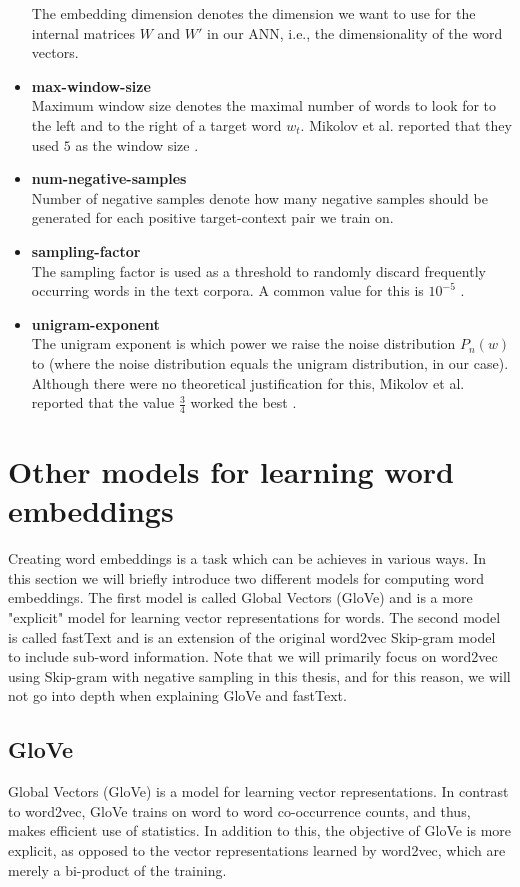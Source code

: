 \begin{itemize}
        The embedding dimension denotes the dimension we want to use for the internal matrices $W$ and $W'$ in our ANN, i.e., the dimensionality of the word vectors.
    \item \textbf{max-window-size} \\
        Maximum window size denotes the maximal number of words to look for to the left and to the right of a target word $w_t$. Mikolov et al. reported that they used $5$ as the window size \cite{mikolov2013b}.
    \item \textbf{num-negative-samples} \\
        Number of negative samples denote how many negative samples should be generated for each positive target-context pair we train on.
    \item \textbf{sampling-factor} \\
        The sampling factor is used as a threshold to randomly discard frequently occurring words in the text corpora. A common value for this is $10^{-5}$ \cite{mikolov2013b}.
    \item \textbf{unigram-exponent} \\
        The unigram exponent is which power we raise the noise distribution $P_n(w)$ to (where the noise distribution equals the unigram distribution, in our case). Although there were no theoretical justification for this, Mikolov et al. reported that the value $\frac{3}{4}$ worked the best \cite{mikolov2013b}.
\end{itemize}

\section{Other models for learning word embeddings}
Creating word embeddings is a task which can be achieves in various ways. In this section we will briefly introduce two different models for computing word embeddings. The first model is called Global Vectors (GloVe) \cite{pennington2014glove} and is a more "explicit" model for learning vector representations for words. The second model is called fastText \cite{bojanowski2017enriching} and is an extension of the original word2vec Skip-gram model to include sub-word information. Note that we will primarily focus on word2vec using Skip-gram with negative sampling in this thesis, and for this reason, we will not go into depth when explaining GloVe and fastText.

\subsection{GloVe}
Global Vectors (GloVe) \cite{pennington2014glove} is a model for learning vector representations. In contrast to word2vec, GloVe trains on word to word co-occurrence counts, and thus, makes efficient use of statistics. In addition to this, the objective of GloVe is more explicit, as opposed to the vector representations learned by word2vec, which are merely a bi-product of the training.

